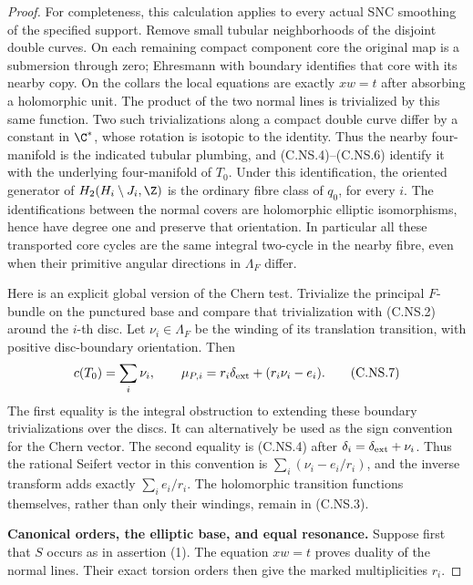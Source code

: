 \begin{proof}
For completeness, this calculation applies to every
actual SNC smoothing of the specified support.
Remove small tubular neighborhoods of the disjoint
double curves. On each remaining compact component
core the original map is a submersion through zero;
Ehresmann with boundary identifies that core with
its nearby copy. On the collars the local equations
are exactly $xw=t$ after absorbing a holomorphic
unit. The product of the two normal lines is
trivialized by this same function. Two such
trivializations along a compact double curve differ
by a constant in $\C^*$, whose rotation is isotopic
to the identity. Thus the nearby four-manifold is
the indicated tubular plumbing, and (C.NS.4)--(C.NS.6)
identify it with the underlying four-manifold of
$T_0$. Under this identification, the oriented
generator of $H_2(H_i\setminus J_i,\Z)$ is the
ordinary fibre class of $q_0$, for every $i$.
The identifications between the normal covers are
holomorphic elliptic isomorphisms, hence have degree
one and preserve that orientation. In particular all
these transported core cycles are the same integral
two-cycle in the nearby fibre, even when their
primitive angular directions in $\Lambda_F$ differ.

Here is an explicit global version of the Chern test.
Trivialize the principal $F$-bundle on the punctured
base and compare that trivialization with (C.NS.2)
around the $i$-th disc. Let $\nu_i\in\Lambda_F$ be
the winding of its translation transition, with
positive disc-boundary orientation. Then
\[
 c(T_0)=\sum_i\nu_i,\qquad
 \mu_{P,i}=r_i\delta_{\rm ext}
                    +(r_i\nu_i-e_i).
                                                        \tag{C.NS.7}
\]
The first equality is the integral obstruction to
extending these boundary trivializations over the
discs. It can alternatively be used as the sign
convention for the Chern vector. The second equality
is (C.NS.4) after $\delta_i=\delta_{\rm ext}+\nu_i$.
Thus the rational Seifert vector in this convention
is $\sum_i(\nu_i-e_i/r_i)$, and the inverse transform
adds exactly $\sum_i e_i/r_i$. The holomorphic
transition functions themselves, rather than only
their windings, remain in (C.NS.3).

\par\medskip\noindent\textbf{Canonical orders, the elliptic base, and equal resonance.}
Suppose first that $S$ occurs as in assertion (1).
The equation $xw=t$ proves duality of the normal
lines. Their exact torsion orders then give the
marked multiplicities $r_i$.


\end{proof}
